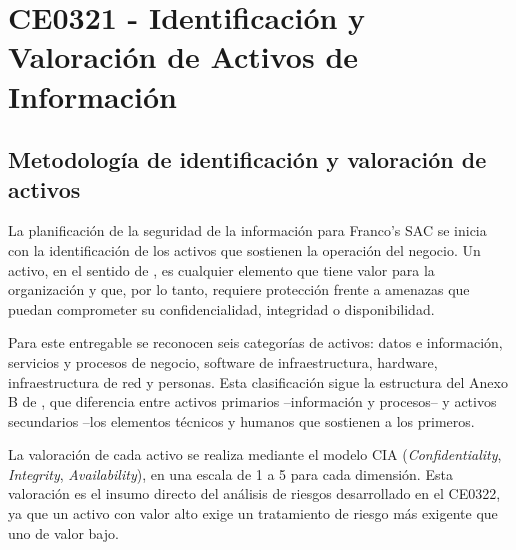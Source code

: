 \documentclass[11pt, a4paper, oneside]{report}
\begin{document}
\newpage
\pagestyle{fancy}
\tableofcontents
\clearpage
{}


\newpage
\pagestyle{fancy} %


\chapter{CE0321 - Identificación y Valoración de Activos de Información}

\section{Metodología de identificación y valoración de activos}

La planificación de la seguridad de la información para Franco's SAC se inicia con la identificación de los activos que sostienen la operación del negocio. Un activo, en el sentido de \citet{iso27005}, es cualquier elemento que tiene valor para la organización y que, por lo tanto, requiere protección frente a amenazas que puedan comprometer su confidencialidad, integridad o disponibilidad.

Para este entregable se reconocen seis categorías de activos: datos e información, servicios y procesos de negocio, software de infraestructura, hardware, infraestructura de red y personas. Esta clasificación sigue la estructura del Anexo B de \citet{iso27005}, que diferencia entre activos primarios --información y procesos-- y activos secundarios --los elementos técnicos y humanos que sostienen a los primeros.

La valoración de cada activo se realiza mediante el modelo CIA (\textit{Confidentiality}, \textit{Integrity}, \textit{Availability}), en una escala de 1 a 5 para cada dimensión. Esta valoración es el insumo directo del análisis de riesgos desarrollado en el CE0322, ya que un activo con valor alto exige un tratamiento de riesgo más exigente que uno de valor bajo.
\end{document}
